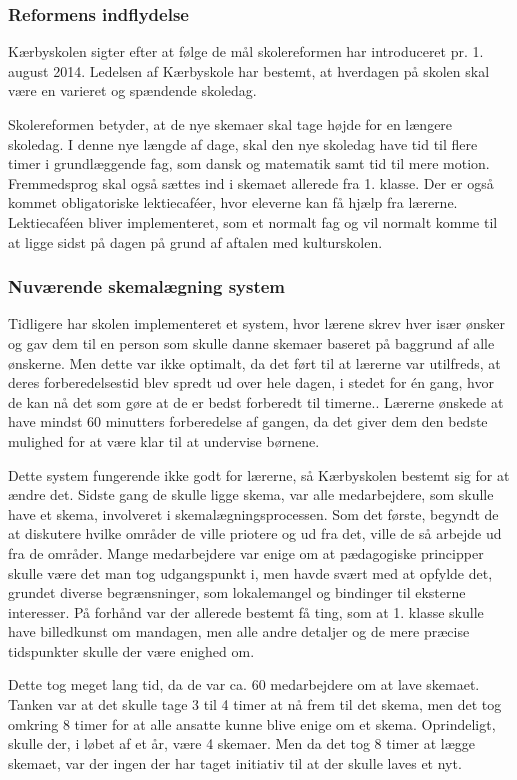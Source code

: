 \subsubsection{Reformens indflydelse}
\label{Reformens_indflydelse}
Kærbyskolen sigter efter at følge de mål skolereformen har introduceret pr. 1. august 2014. Ledelsen af Kærbyskole har bestemt, at hverdagen på skolen skal være en varieret og spændende skoledag.

Skolereformen betyder, at de nye skemaer skal tage højde for en længere skoledag. I denne nye længde af dage, skal den nye skoledag have tid til flere timer i grundlæggende fag, som dansk og matematik samt tid til mere motion. Fremmedsprog skal også sættes ind i skemaet allerede fra 1. klasse. Der er også kommet obligatoriske lektiecaféer, hvor eleverne kan få hjælp fra lærerne. Lektiecaféen bliver implementeret, som et normalt fag og vil normalt komme til at ligge sidst på dagen på grund af aftalen med kulturskolen\cite{kaerby_skolereform}.

\subsubsection {Nuværende skemalægning system}
Tidligere har skolen implementeret et system, hvor lærene skrev hver især ønsker og gav dem til en person som skulle danne skemaer baseret på baggrund af alle ønskerne. Men dette var ikke optimalt, da det ført til at lærerne var utilfreds, at deres forberedelsestid blev spredt ud over hele dagen, i stedet for én gang, hvor de kan nå det som gøre at de er bedst forberedt til timerne.. Lærerne ønskede at have mindst 60 minutters forberedelse af gangen, da det giver dem den bedste mulighed for at være klar til at undervise børnene.

Dette system fungerende ikke godt for lærerne, så Kærbyskolen bestemt sig for at ændre det. Sidste gang de skulle ligge skema, var alle medarbejdere, som skulle have et skema, involveret i skemalægningsprocessen. Som det første, begyndt de at diskutere hvilke områder de ville priotere og ud fra det, ville de så arbejde ud fra de områder. Mange medarbejdere var enige om at pædagogiske principper skulle være det man tog udgangspunkt i, men havde svært med at opfylde det, grundet diverse begrænsninger, som lokalemangel og bindinger til eksterne interesser. På forhånd var der allerede bestemt få ting, som at 1. klasse skulle have billedkunst om mandagen, men alle andre detaljer og de mere præcise tidspunkter skulle der være enighed om. 

Dette tog meget lang tid, da de var ca. 60 medarbejdere om at lave skemaet. Tanken var at det skulle tage 3 til 4 timer at nå frem til det skema, men det tog omkring 8 timer for at alle ansatte kunne blive enige om et skema. Oprindeligt, skulle der, i løbet af et år, være 4 skemaer. Men da det tog 8 timer at lægge skemaet, var der ingen der har taget initiativ til at der skulle laves et nyt. 


